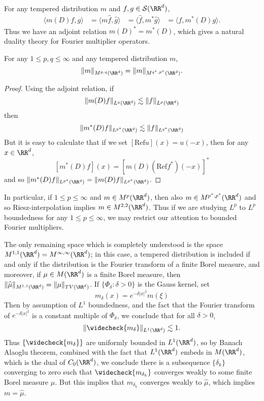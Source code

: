 For any tempered distribution $m$ and $f,g \in \mathcal{S}(\RR^d)$,
%
\begin{align*}
  \langle m(D) f, g \rangle &= \langle m \widehat{f}, \widehat{g} \rangle
  &= \langle \widehat{f}, m^* \widehat{g} \rangle
  &= \langle f, m^*(D) g \rangle.
\end{align*}
%
Thus we have an adjoint relation $m(D)^* = m^*(D)$, which gives a natural duality theory for Fourier multiplier operators.

\begin{theorem}
  For any $1 \leq p,q \leq \infty$ and any tempered distribution $m$,
  \[ \| m \|_{M^{p,q}(\RR^d)} = \| m \|_{M^{q^*,p^*}(\RR^d)}. \]
\end{theorem}
\begin{proof}
  Using the adjoint relation, if
  \[ \| m(D) f \|_{L^q(\RR^d)} \lesssim \| f \|_{L^p(\RR^d)} \]
  then
  \[ \| m^*(D) f \|_{L^{p^*}(\RR^d)} \lesssim \| f \|_{L^{q^*}(\RR^d)} \]
  But it is easy to calculate that if we set $[\text{Ref} u](x) = u(-x)$, then for any $x \in \RR^d$,
  \[ [m^*(D) f](x) = [m(D)(\text{Ref}f^*)(-x)]^* \]
  and so $\| m^*(D) f \|_{L^{p^*}(\RR^d)} = \| m(D) f \|_{L^{p^*}(\RR^d)}$.
\end{proof}

In particular, if $1 \leq p \leq \infty$ and $m \in M^p(\RR^d)$, then also $m \in M^{p^*,p^*}(\RR^d)$ and so Riesz-interpolation implies $m \in M^{2,2}(\RR^d)$. Thus if we are studying $L^p$ to $L^p$ boundedness for any $1 \leq p \leq \infty$, we may restrict our attention to bounded Fourier multipliers.

\begin{example}
  The only remaining space which is completely understood is the space $M^{1,1}(\RR^d) = M^{\infty,\infty}(\RR^d)$; in this case, a tempered distribution is included if and only if the distribution is the Fourier transform of a finite Borel measure, and moreover, if $\mu \in M(\RR^d)$ is a finite Borel measure, then $\| \widehat{\mu} \|_{M^{1,1}(\RR^d)} = \| \mu \|_{TV(\RR^d)}$. If $\{ \Phi_\delta : \delta > 0 \}$ is the Gauss kernel, set
  \[ m_\delta(x) = e^{- \delta |x|^2} m(\xi) \]
  Then by assumption of $L^1$ boundedness, and the fact that the Fourier transform of $e^{-\delta |x|^2}$ is a constant multiple of $\Phi_\delta$, we conclude that for all $\delta > 0$,
  \[ \| \widecheck{m_\delta} \|_{L^1(\RR^d)} \lesssim 1. \]
  Thus $\{ \widecheck{m_\delta} \}$ are uniformly bounded in $L^1(\RR^d)$, so by Banach Alaoglu theorem, combined with the fact that $L^1(\RR^d)$ embeds in $M(\RR^d)$, which is the dual of $C_0(\RR^d)$, we conclude there is a subsequence $\{ \delta_k \}$ converging to zero such that $\widecheck{m_{\delta_k}}$ converges weakly to some finite Borel measure $\mu$. But this implies that $m_{\delta_k}$ converges weakly to $\widehat{\mu}$, which implies $m = \widehat{\mu}$.
\end{example}

